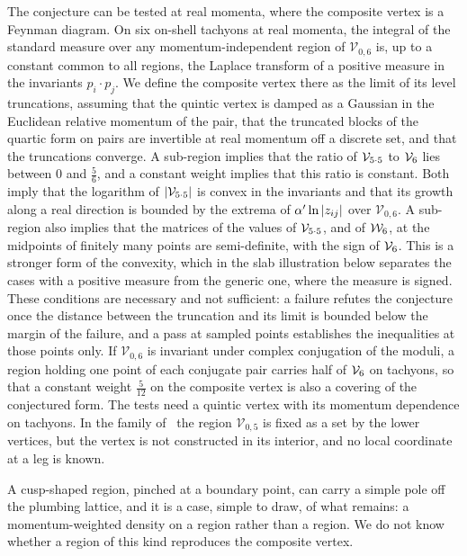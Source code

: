   The conjecture can be tested at real momenta, where the composite vertex is a Feynman diagram.
  On six on-shell tachyons at real momenta, the integral of the standard measure over any momentum-independent region of $\mathcal V_{0,6}$ is, up to a constant common to all regions, the Laplace transform of a positive measure in the invariants $p_i \cdot p_j$.
  We define the composite vertex there as the limit of its level truncations, assuming that the quintic vertex is damped as a Gaussian in the Euclidean relative momentum of the pair, that the truncated blocks of the quartic form on pairs are invertible at real momentum off a discrete set, and that the truncations converge.
  A sub-region implies that the ratio of $\mathcal{V}_{5 \cdot 5}$ to $\mathcal{V}_{6}$ lies between $0$ and $\tfrac{5}{6}$, and a constant weight implies that this ratio is constant.
  Both imply that the logarithm of ${|\mathcal{V}_{5 \cdot 5}|}$ is convex in the invariants and that its growth along a real direction is bounded by the extrema of $\alpha' \ln {|z_{ij}|}$ over $\mathcal V_{0,6}$.
  A sub-region also implies that the matrices of the values of $\mathcal{V}_{5 \cdot 5}$, and of $\mathcal{W}_{6}$, at the midpoints of finitely many points are semi-definite, with the sign of $\mathcal{V}_{6}$.
  This is a stronger form of the convexity, which in the slab illustration below separates the cases with a positive measure from the generic one, where the measure is signed.
  These conditions are necessary and not sufficient: a failure refutes the conjecture once the distance between the truncation and its limit is bounded below the margin of the failure, and a pass at sampled points establishes the inequalities at those points only.
  If $\mathcal V_{0,6}$ is invariant under complex conjugation of the moduli, a region holding one point of each conjugate pair carries half of $\mathcal{V}_{6}$ on tachyons, so that a constant weight $\tfrac{5}{12}$ on the composite vertex is also a covering of the conjectured form.
  The tests need a quintic vertex with its momentum dependence on tachyons.
  In the family of~\cite{Erbin:2026:SL2CVerticesClosed} the region $\mathcal V_{0,5}$ is fixed as a set by the lower vertices, but the vertex is not constructed in its interior, and no local coordinate at a leg is known.

A cusp-shaped region, pinched at a boundary point, can carry a simple pole off the plumbing lattice, and it is a case, simple to draw, of what remains: a momentum-weighted density on a region rather than a region.
We do not know whether a region of this kind reproduces the composite vertex.

